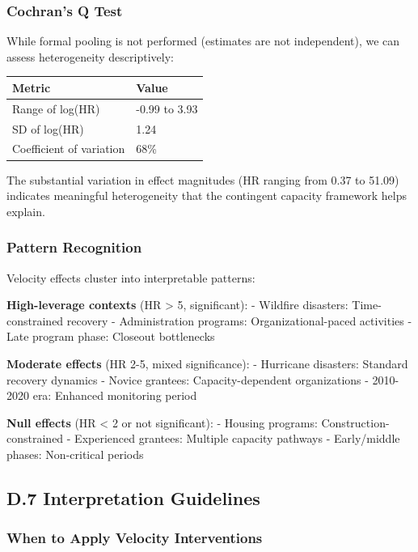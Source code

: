 \documentclass[
  12pt,
  letterpaper,
]{article}
\begin{document}
\subsubsection{Cochran's Q Test}\label{cochrans-q-test}

While formal pooling is not performed (estimates are not independent),
we can assess heterogeneity descriptively:

\begin{longtable}[]{@{}ll@{}}
\toprule\noalign{}
Metric & Value \\
\midrule\noalign{}
\endhead
\bottomrule\noalign{}
\endlastfoot
Range of log(HR) & -0.99 to 3.93 \\
SD of log(HR) & 1.24 \\
Coefficient of variation & 68\% \\
\end{longtable}

The substantial variation in effect magnitudes (HR ranging from 0.37 to
51.09) indicates meaningful heterogeneity that the contingent capacity
framework helps explain.

\subsubsection{Pattern Recognition}\label{pattern-recognition}

Velocity effects cluster into interpretable patterns:

\textbf{High-leverage contexts} (HR \textgreater{} 5, significant): -
Wildfire disasters: Time-constrained recovery - Administration programs:
Organizational-paced activities - Late program phase: Closeout
bottlenecks

\textbf{Moderate effects} (HR 2-5, mixed significance): - Hurricane
disasters: Standard recovery dynamics - Novice grantees:
Capacity-dependent organizations - 2010-2020 era: Enhanced monitoring
period

\textbf{Null effects} (HR \textless{} 2 or not significant): - Housing
programs: Construction-constrained - Experienced grantees: Multiple
capacity pathways - Early/middle phases: Non-critical periods

\subsection{D.7 Interpretation
Guidelines}\label{d.7-interpretation-guidelines}

\subsubsection{When to Apply Velocity
Interventions}\label{when-to-apply-velocity-interventions}
\end{document}
